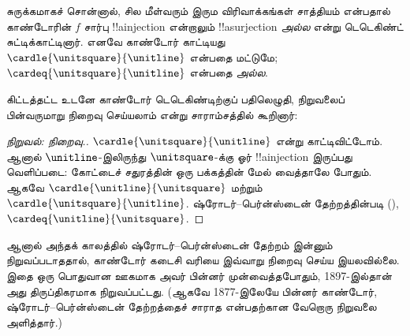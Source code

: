 \documentclass[../../../include/open-logic-section]{subfiles}
\begin{document}
சுருக்கமாகச் சொன்னால், சில மீள்வரும் இரும விரிவாக்கங்கள்
சாத்தியம் என்பதால் காண்டோரின் $f$ சார்பு
!!a{injection} என்றாலும் !!a{surjection} \emph{அல்ல}
என்று டெடெகிண்ட் சுட்டிக்காட்டினார்.
எனவே காண்டோர் காட்டியது
$\cardle{\unitsquare}{\unitline}$ என்பதை மட்டுமே;
$\cardeq{\unitsquare}{\unitline}$ என்பதை \emph{அல்ல}.

கிட்டத்தட்ட உடனே காண்டோர் டெடெகிண்டிற்குப் பதிலெழுதி,
நிறுவலைப் பின்வருமாறு நிறைவு செய்யலாம் என்று சாராம்சத்தில்
கூறினார்:

\begin{proof}[நிறுவல்: நிறைவு.]
$\cardle{\unitsquare}{\unitline}$ என்று காட்டிவிட்டோம்.
ஆனால் $\unitline$-இலிருந்து $\unitsquare$-க்கு
ஓர் !!a{injection} இருப்பது வெளிப்படை:
கோட்டைச் சதுரத்தின் ஒரு பக்கத்தின் மேல் வைத்தாலே போதும்.
ஆகவே $\cardle{\unitline}{\unitsquare}$ மற்றும்
$\cardle{\unitsquare}{\unitline}$. ஷ்ரோடர்--பெர்ன்ஸ்டைன்
தேற்றத்தின்படி
(),
$\cardeq{\unitline}{\unitsquare}$.
\end{proof}

ஆனால் அந்தக் காலத்தில் ஷ்ரோடர்--பெர்ன்ஸ்டைன் தேற்றம்
இன்னும் நிறுவப்படாததால், காண்டோர் கடைசி வரியை
இவ்வாறு நிறைவு செய்ய இயலவில்லை. இதை ஒரு பொதுவான
ஊகமாக அவர் பின்னர் முன்வைத்தபோதும், 1897-இல்தான்
அது திருப்திகரமாக நிறுவப்பட்டது. (ஆகவே 1877-இலேயே
பின்னர் காண்டோர், ஷ்ரோடர்--பெர்ன்ஸ்டைன் தேற்றத்தைச்
சாராத  என்பதற்கான வேறொரு
நிறுவலை அளித்தார்.)
\end{document}
